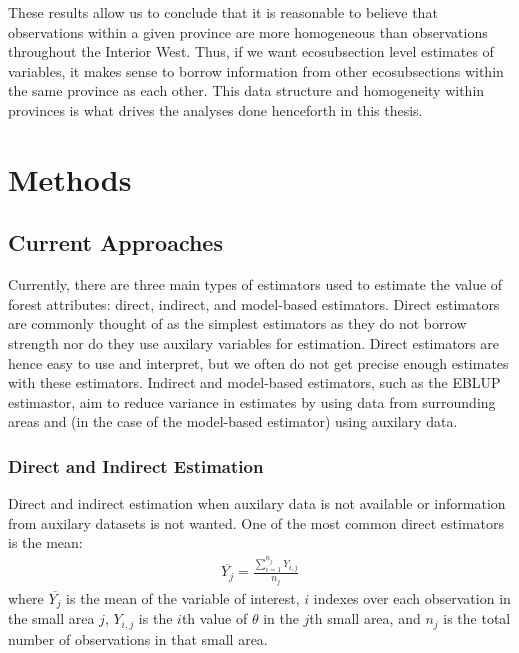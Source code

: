 \documentclass[12pt,twoside]{reedthesis}
\begin{document}
These results allow us to conclude that it is reasonable to believe that observations within a given province are more homogeneous than observations throughout the Interior West. Thus, if we want ecosubsection level estimates of variables, it makes sense to borrow information from other ecosubsections within the same province as each other. This data structure and homogeneity within provinces is what drives the analyses done henceforth in this thesis.

\hypertarget{methods}{%
\chapter{Methods}\label{methods}}

\hypertarget{current-approaches}{%
\section{Current Approaches}\label{current-approaches}}

Currently, there are three main types of estimators used to estimate the value of forest attributes: direct, indirect, and model-based estimators. Direct estimators are commonly thought of as the simplest estimators as they do not borrow strength nor do they use auxilary variables for estimation. Direct estimators are hence easy to use and interpret, but we often do not get precise enough estimates with these estimators. Indirect and model-based estimators, such as the EBLUP estimastor, aim to reduce variance in estimates by using data from surrounding areas and (in the case of the model-based estimator) using auxilary data.

\hypertarget{direct-and-indirect-estimation}{%
\subsection{Direct and Indirect Estimation}\label{direct-and-indirect-estimation}}

Direct and indirect estimation when auxilary data is not available or information from auxilary datasets is not wanted. One of the most common direct estimators is the mean:
\begin{align}
\overline{Y_j} = \frac{\sum_{i=1}^{n_j} Y_{i, j}}{n_j}
\end{align}
where \(\overline{Y_j}\) is the mean of the variable of interest, \(i\) indexes over each observation in the small area \(j\), \(Y_{i,j}\) is the \(i\)th value of \(\theta\) in the \(j\)th small area, and \(n_j\) is the total number of observations in that small area.
\end{document}
